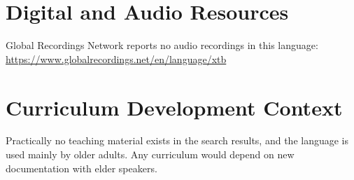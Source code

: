\documentclass[12pt]{article}
\begin{document}
\section{Digital and Audio Resources}
Global Recordings Network reports no audio recordings in this language: \url{https://www.globalrecordings.net/en/language/xtb}

\section{Curriculum Development Context}
Practically no teaching material exists in the search results, and the language is used mainly by older adults. Any curriculum would depend on new documentation with elder speakers.
\end{document}

